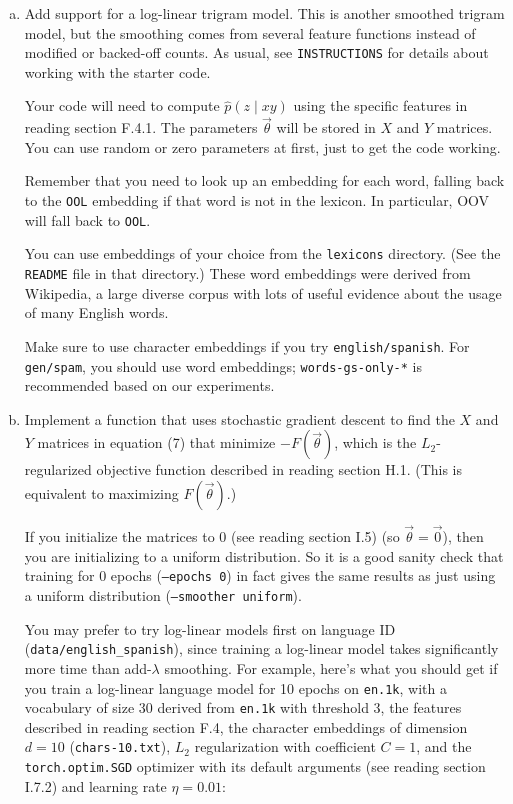 \documentclass[12pt]{article}
\theoremstyle{plain}
\theoremstyle{definition}
\theoremstyle{remark}
\begin{document}
\begin{enumerate}[(a)]
\item Add support for a log-linear trigram model. This is another smoothed trigram model, but the smoothing comes from several feature functions instead of modified or backed-off counts. As usual, see \texttt{INSTRUCTIONS} for details about working with the starter code.

Your code will need to compute $\hat{p}(z \mid xy)$ using the specific features in reading section F.4.1. The parameters $\vec{\theta}$ will be stored in $X$ and $Y$ matrices. You can use random or zero parameters at first, just to get the code working.

Remember that you need to look up an embedding for each word, falling back to the \texttt{OOL} embedding if that word is not in the lexicon. In particular, OOV will fall back to \texttt{OOL}.

You can use embeddings of your choice from the \texttt{lexicons} directory. (See the \texttt{README} file in that directory.) These word embeddings were derived from Wikipedia, a large diverse corpus with lots of useful evidence about the usage of many English words.

Make sure to use character embeddings if you try \texttt{english/spanish}. For \texttt{gen/spam}, you should use word embeddings; \texttt{words-gs-only-*} is recommended based on our experiments.

\item Implement a function that uses stochastic gradient descent to find the $X$ and $Y$ matrices in equation (7) that minimize $-F(\vec{\theta})$, which is the $L_2$-regularized objective function described in reading section H.1. (This is equivalent to maximizing $F(\vec{\theta})$.)

If you initialize the matrices to 0 (see reading section I.5) (so $\vec{\theta}=\vec{0}$), then you are initializing to a uniform distribution. So it is a good sanity check that training for 0 epochs (\texttt{--epochs 0}) in fact gives the same results as just using a uniform distribution (\texttt{--smoother uniform}).

You may prefer to try log-linear models first on language ID (\texttt{data/english\_spanish}), since training a log-linear model takes significantly more time than add-$\lambda$ smoothing. For example, here’s what you should get if you train a log-linear language model for 10 epochs on \texttt{en.1k}, with a vocabulary of size 30 derived from \texttt{en.1k} with threshold 3, the features described in reading section F.4, the character embeddings of dimension $d=10$ (\texttt{chars-10.txt}), $L_2$ regularization with coefficient $C=1$, and the \texttt{torch.optim.SGD} optimizer with its default arguments (see reading section I.7.2) and learning rate $\eta=0.01$:


\end{enumerate}
\end{document}
